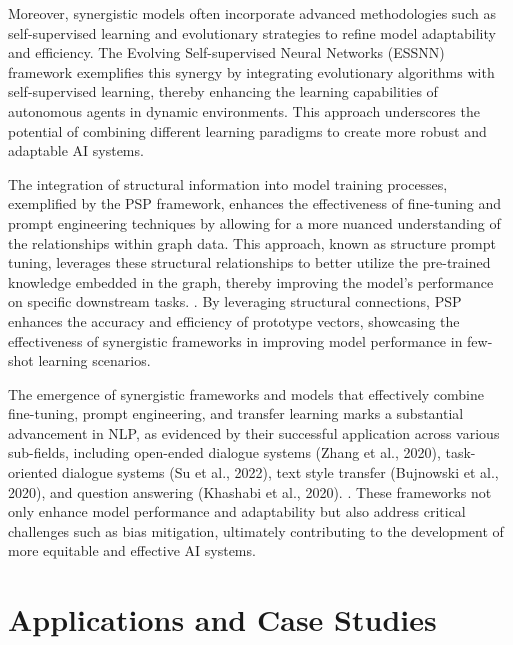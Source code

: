 Moreover, synergistic models often incorporate advanced methodologies such as self-supervised learning and evolutionary strategies to refine model adaptability and efficiency. The Evolving Self-supervised Neural Networks (ESSNN) framework exemplifies this synergy by integrating evolutionary algorithms with self-supervised learning, thereby enhancing the learning capabilities of autonomous agents in dynamic environments. This approach underscores the potential of combining different learning paradigms to create more robust and adaptable AI systems.



The integration of structural information into model training processes, exemplified by the PSP framework, enhances the effectiveness of fine-tuning and prompt engineering techniques by allowing for a more nuanced understanding of the relationships within graph data. This approach, known as structure prompt tuning, leverages these structural relationships to better utilize the pre-trained knowledge embedded in the graph, thereby improving the model's performance on specific downstream tasks. \cite{ge2024psppretrainingstructureprompt}. By leveraging structural connections, PSP enhances the accuracy and efficiency of prototype vectors, showcasing the effectiveness of synergistic frameworks in improving model performance in few-shot learning scenarios.



The emergence of synergistic frameworks and models that effectively combine fine-tuning, prompt engineering, and transfer learning marks a substantial advancement in NLP, as evidenced by their successful application across various sub-fields, including open-ended dialogue systems (Zhang et al., 2020), task-oriented dialogue systems (Su et al., 2022), text style transfer (Bujnowski et al., 2020), and question answering (Khashabi et al., 2020). \cite{tang2023mvpmultitasksupervisedpretraining}. These frameworks not only enhance model performance and adaptability but also address critical challenges such as bias mitigation, ultimately contributing to the development of more equitable and effective AI systems.













\section{Applications and Case Studies} \label{sec:Applications and Case Studies}

